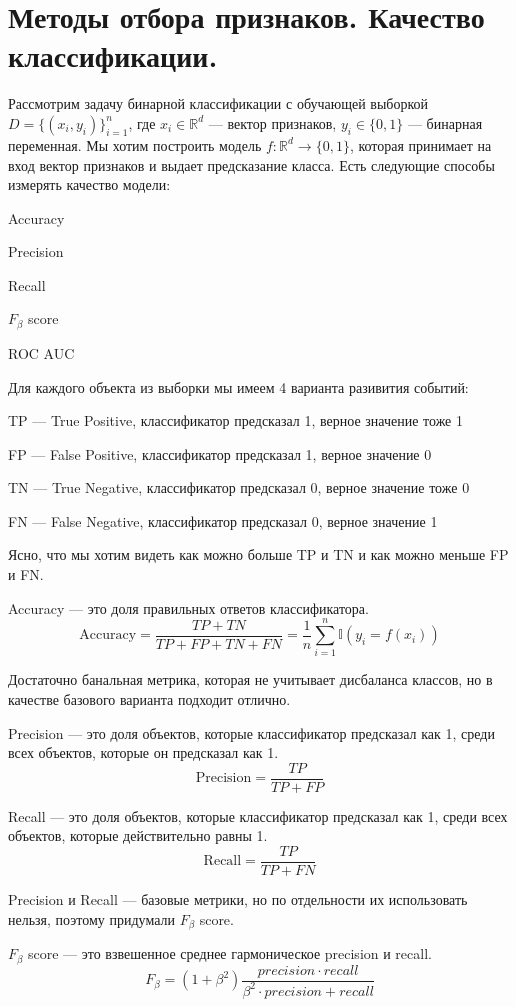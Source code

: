 \section*{Методы отбора признаков. Качество классификации.}
Рассмотрим задачу бинарной классификации с обучающей выборкой $D = \{(x_i, y_i)\}_{i=1}^n$, где $x_i \in \mathbb{R}^d$ --- вектор признаков, $y_i \in \{0, 1\}$ --- бинарная переменная.
Мы хотим построить модель $f: \mathbb{R}^d \to \{0, 1\}$, которая принимает на вход вектор признаков и выдает предсказание класса.
Есть следующие способы измерять качество модели:

Accuracy

Precision

Recall

$F_{\beta}$ score

ROC AUC

Для каждого объекта из выборки мы имеем 4 варианта разивития событий:

TP --- True Positive, классификатор предсказал 1, верное значение тоже 1

FP --- False Positive, классификатор предсказал 1, верное значение 0

TN --- True Negative, классификатор предсказал 0, верное значение тоже 0

FN --- False Negative, классификатор предсказал 0, верное значение 1


Ясно, что мы хотим видеть как можно больше TP и TN и как можно меньше FP и FN.

Accuracy --- это доля правильных ответов классификатора.
$$
    \text{Accuracy} = \frac{TP + TN}{TP + FP + TN + FN} = \frac{1}{n} \sum_{i=1}^n \mathbb{I}(y_i = f(x_i))
$$

Достаточно банальная метрика, которая не учитывает дисбаланса классов, но в качестве базового варианта подходит отлично.

Precision --- это доля объектов, которые классификатор предсказал как 1, среди всех объектов, которые он предсказал как 1.
$$
    \text{Precision} = \frac{TP}{TP + FP}
$$

Recall --- это доля объектов, которые классификатор предсказал как 1, среди всех объектов, которые действительно равны 1.
$$
    \text{Recall} = \frac{TP}{TP + FN}
$$

Precision и Recall --- базовые метрики, но по отдельности их использовать нельзя, поэтому придумали $F_{\beta}$ score.

$F_{\beta}$ score --- это взвешенное среднее гармоническое precision и recall.
$$
    F_{\beta} = (1 + \beta^2) \frac{precision \cdot recall}{\beta^2 \cdot precision + recall}
$$

